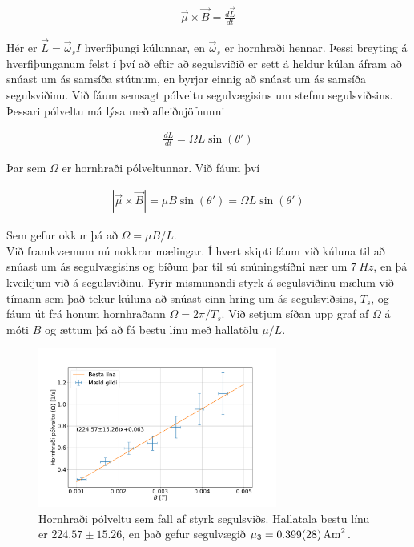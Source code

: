 \documentclass[11pt]{article}
\begin{document}
\begin{align}
\Vec{\mu} \times \Vec{B} = \frac{d\Vec{L}}{dt}
\end{align}

Hér er $\Vec{L} = \Vec{\omega}_s I$ hverfiþungi kúlunnar, en $\Vec{\omega}_s$ er hornhraði hennar. Þessi breyting á hverfiþunganum felst í því að eftir að segulsviðið er sett á heldur kúlan áfram að snúast um ás samsíða stútnum, en byrjar einnig að snúast um ás samsíða segulsviðinu. Við fáum semsagt pólveltu segulvægisins um stefnu segulsviðsins. Þessari pólveltu má lýsa með afleiðujöfnunni

\begin{align}
\frac{dL}{dt} = \Omega L \sin(\theta ')
\end{align}

Þar sem $\Omega$ er hornhraði pólveltunnar. Við fáum því

\begin{align}
|\Vec{\mu} \times \Vec{B}| = \mu B \sin(\theta ') = \Omega L \sin(\theta ')
\end{align}

Sem gefur okkur þá að $\Omega = \mu B/L$. \\
Við framkvæmum nú nokkrar mælingar. Í hvert skipti fáum við kúluna til að snúast um ás segulvægisins og bíðum þar til sú snúningstíðni nær um $\SI{7}{Hz}$, en þá kveikjum við á segulsviðinu. Fyrir mismunandi styrk á segulsviðinu mælum við tímann sem það tekur kúluna að snúast einn hring um ás segulsviðsins, $T_s$, og fáum út frá honum hornhraðann $\Omega = 2\pi/T_s$. Við setjum síðan upp graf af $\Omega$ á móti $B$ og ættum þá að fá bestu línu með hallatölu $\mu/L$.


\begin{figure}[H]
    \centering
    \includegraphics[width=0.7\textwidth]{Hluti_3.PDF}
    \caption{Hornhraði pólveltu sem fall af styrk segulsviðs. Hallatala bestu línu er $224.57 \pm 15.26$, en það gefur segulvægið $\mu_3 = \SI{0.399 \pm 0.028}{A m^2}$.}
    \label{fig:hluti 3}
\end{figure}
\end{document}
